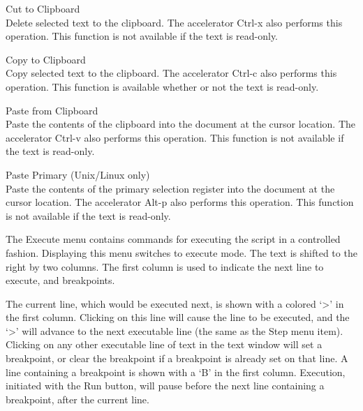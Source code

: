 \begin{description}
\item{\cb Cut to Clipboard}\\
Delete selected text to the clipboard.  The accelerator {\kb Ctrl-x}
also performs this operation.  This function is not available if the
text is read-only.

\item{\cb Copy to Clipboard}\\
Copy selected text to the clipboard.  The accelerator {\kb Ctrl-c}
also performs this operation.  This function is available whether or
not the text is read-only.

\item{\cb Paste from Clipboard}\\
Paste the contents of the clipboard into the document at the cursor
location.  The accelerator {\kb Ctrl-v} also performs this operation. 
This function is not available if the text is read-only.

\item{\cb Paste Primary} (Unix/Linux only)\\
Paste the contents of the primary selection register into the document
at the cursor location.  The accelerator {\kb Alt-p} also performs
this operation.  This function is not available if the text is
read-only.
\end{description}

The {\cb Execute} menu contains commands for executing the script in a
controlled fashion.  Displaying this menu switches to execute mode. 
The text is shifted to the right by two columns.  The first column is
used to indicate the next line to execute, and breakpoints.

The current line, which would be executed next, is shown with a
colored `{\vt >}' in the first column.  Clicking on this line will
cause the line to be executed, and the `{\vt >}' will advance to the
next executable line (the same as the {\cb Step} menu item).  Clicking
on any other executable line of text in the text window will set a
breakpoint, or clear the breakpoint if a breakpoint is already set on
that line.  A line containing a breakpoint is shown with a `{\vt B}'
in the first column.  Execution, initiated with the {\cb Run} button,
will pause before the next line containing a breakpoint, after the
current line.

